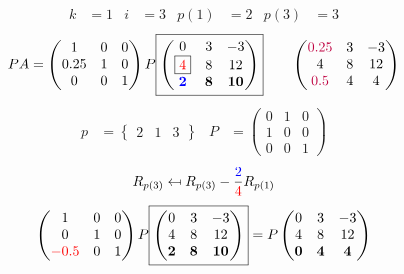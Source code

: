 \documentclass[pdf]{beamer}
\begin{document}
\begin{frame}{}\begin{align*} k &= 1 & i &= 3 & p(1) &= 2 & p(3) &= 3\end{align*} $$PA=\begin{pmatrix}1&0&0\\0.25&1&0\\0&0&1\end{pmatrix} P \boxed{\begin{pmatrix}0&3&-3\\\boxed{{\color{red}4}}&8&12\\\mathbf{{\color{blue}2}}&\mathbf{8}&\mathbf{10}\end{pmatrix}} \quad\quad \begin{pmatrix}{\color{purple}0.25}&3&-3\\4&8&12\\{\color{purple}0.5}&4&4\end{pmatrix}$$ \begin{align*} p&= \begin{Bmatrix}2&1&3\end{Bmatrix} & P&= \begin{pmatrix}0&1&0\\1&0&0\\0&0&1\end{pmatrix} \end{align*} $$R_{p(3)} \mapsfrom R_{p(3)} - \frac{{\color{blue}2}}{{\color{red}4}} R_{p(1)}$$ $$ \begin{pmatrix}1&0&0\\0&1&0\\{\color{red}-0.5}&0&1\end{pmatrix} P \boxed{\begin{pmatrix}0&3&-3\\4&8&12\\\mathbf{2}&\mathbf{8}&\mathbf{10}\end{pmatrix}} = P \begin{pmatrix}0&3&-3\\4&8&12\\\mathbf{0}&\mathbf{4}&\mathbf{4}\end{pmatrix} $$\end{frame}
\end{document}
